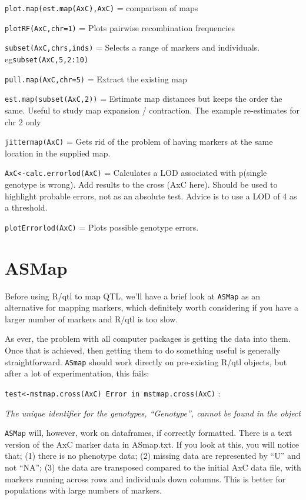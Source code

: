 \documentclass[
]{book}
\begin{document}
\texttt{plot.map(est.map(AxC),AxC)} = comparison of maps

\texttt{plotRF(AxC,chr=1)} = Plots pairwise recombination frequencies

\texttt{subset(AxC,chrs,inds)} = Selects a range of markers and individuals. eg\texttt{subset(AxC,5,2:10)}

\texttt{pull.map(AxC,chr=5)} = Extract the existing map

\texttt{est.map(subset(AxC,2))} = Estimate map distances but keeps the order the same. Useful to study map expansion / contraction. The example re-estimates for chr 2 only

\texttt{jittermap(AxC)} = Gets rid of the problem of having markers at the same location in the supplied map.

\texttt{AxC\textless{}-calc.errorlod(AxC)} = Calculates a LOD associated with p(single genotype is wrong). Add results to the cross (AxC here). Should be used to highlight probable errors, not as an absolute test. Advice is to use a LOD of 4 as a threshold.

\texttt{plotErrorlod(AxC)} = Plots possible genotype errors.

\hypertarget{asmap}{%
\section{ASMap}\label{asmap}}

Before using R/qtl to map QTL, we'll have a brief look at \texttt{ASMap} as an alternative for mapping markers, which definitely worth considering if you have a larger number of markers and R/qtl is too slow.

As ever, the problem with all computer packages is getting the data into them. Once that is achieved, then getting them to do something useful is generally straightforward. \texttt{ASmap} should work directly on pre-existing R/qtl objects, but after a lot of experimentation, this fails:

\texttt{test\textless{}-mstmap.cross(AxC)\ Error\ in\ mstmap.cross(AxC)} :

\emph{The unique identifier for the genotypes, ``Genotype'', cannot be found in the object}

\texttt{ASMap} will, however, work on dataframes, if correctly formatted. There is a text version of the AxC marker data in ASmap.txt. If you look at this, you will notice that; (1) there is no phenotype data; (2) missing data are represented by ``U'' and not ``NA''; (3) the data are transposed compared to the initial AxC data file, with markers running across rows and individuals down columns. This is better for populations with large numbers of markers.
\end{document}
